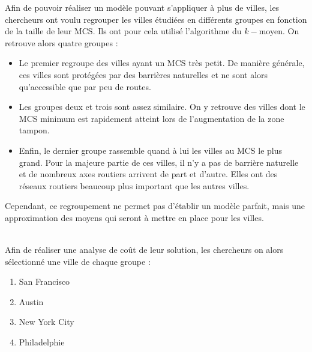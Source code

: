 Afin de pouvoir réaliser un modèle pouvant s'appliquer à plus de villes, les chercheurs ont voulu regrouper les villes étudiées en différents groupes en fonction de la taille de leur MCS. Ils ont pour cela utilisé l'algorithme du $k-$moyen. On retrouve alors quatre groupes :
\begin{itemize}
 \item Le premier regroupe des villes ayant un MCS très petit. De manière générale, ces villes sont protégées par des barrières naturelles et ne sont alors qu'accessible que par peu de routes.
 \item Les groupes deux et trois sont assez similaire. On y retrouve des villes dont le MCS minimum est rapidement atteint lors de l'augmentation de la zone tampon.
 \item Enfin, le dernier groupe rassemble quand à lui les villes au MCS le plus grand. Pour la majeure partie de ces villes, il n'y a pas de barrière naturelle et de nombreux axes routiers arrivent de part et d'autre. Elles ont des réseaux routiers beaucoup plus important que les autres villes.
\end{itemize}
Cependant, ce regroupement ne permet pas d'établir un modèle parfait, mais une approximation des moyens qui seront à mettre en place pour les villes.\\~\\\par
Afin de réaliser une analyse de coût de leur solution, les chercheurs on alors sélectionné une ville de chaque groupe :
\begin{enumerate}
 \item San Francisco
 \item Austin
 \item New York City
 \item Philadelphie
\end{enumerate}
